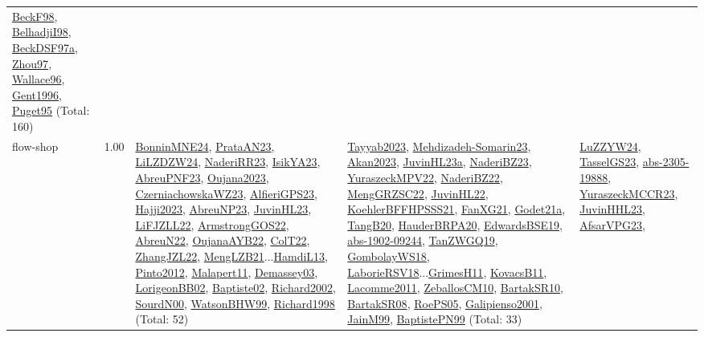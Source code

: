 {\begin{longtable}{p{3cm}r>{\raggedright\arraybackslash}p{6cm}>{\raggedright\arraybackslash}p{6cm}>{\raggedright\arraybackslash}p{8cm}}
\hyperref[detail:BeckF98]{BeckF98}, \hyperref[detail:BelhadjiI98]{BelhadjiI98}, \hyperref[detail:BeckDSF97a]{BeckDSF97a}, \hyperref[detail:Zhou97]{Zhou97}, \hyperref[detail:Wallace96]{Wallace96}, \hyperref[detail:Gent1996]{Gent1996}, \hyperref[detail:Puget95]{Puget95} (Total: 160)\\
\index{flow-shop}\index{Concepts!flow-shop}flow-shop &  1.00 & \hyperref[detail:BonninMNE24]{BonninMNE24}, \hyperref[detail:PrataAN23]{PrataAN23}, \hyperref[detail:LiLZDZW24]{LiLZDZW24}, \hyperref[detail:NaderiRR23]{NaderiRR23}, \hyperref[detail:IsikYA23]{IsikYA23}, \hyperref[detail:AbreuPNF23]{AbreuPNF23}, \hyperref[detail:Oujana2023]{Oujana2023}, \hyperref[detail:CzerniachowskaWZ23]{CzerniachowskaWZ23}, \hyperref[detail:AlfieriGPS23]{AlfieriGPS23}, \hyperref[detail:Hajji2023]{Hajji2023}, \hyperref[detail:AbreuNP23]{AbreuNP23}, \hyperref[detail:JuvinHL23]{JuvinHL23}, \hyperref[detail:LiFJZLL22]{LiFJZLL22}, \hyperref[detail:ArmstrongGOS22]{ArmstrongGOS22}, \hyperref[detail:AbreuN22]{AbreuN22}, \hyperref[detail:OujanaAYB22]{OujanaAYB22}, \hyperref[detail:ColT22]{ColT22}, \hyperref[detail:ZhangJZL22]{ZhangJZL22}, \hyperref[detail:MengLZB21]{MengLZB21}...\hyperref[detail:HamdiL13]{HamdiL13}, \hyperref[detail:Pinto2012]{Pinto2012}, \hyperref[detail:Malapert11]{Malapert11}, \hyperref[detail:Demassey03]{Demassey03}, \hyperref[detail:LorigeonBB02]{LorigeonBB02}, \hyperref[detail:Baptiste02]{Baptiste02}, \hyperref[detail:Richard2002]{Richard2002}, \hyperref[detail:SourdN00]{SourdN00}, \hyperref[detail:WatsonBHW99]{WatsonBHW99}, \hyperref[detail:Richard1998]{Richard1998} (Total: 52) & \hyperref[detail:Tayyab2023]{Tayyab2023}, \hyperref[detail:Mehdizadeh-Somarin23]{Mehdizadeh-Somarin23}, \hyperref[detail:Akan2023]{Akan2023}, \hyperref[detail:JuvinHL23a]{JuvinHL23a}, \hyperref[detail:NaderiBZ23]{NaderiBZ23}, \hyperref[detail:YuraszeckMPV22]{YuraszeckMPV22}, \hyperref[detail:NaderiBZ22]{NaderiBZ22}, \hyperref[detail:MengGRZSC22]{MengGRZSC22}, \hyperref[detail:JuvinHL22]{JuvinHL22}, \hyperref[detail:KoehlerBFFHPSSS21]{KoehlerBFFHPSSS21}, \hyperref[detail:FanXG21]{FanXG21}, \hyperref[detail:Godet21a]{Godet21a}, \hyperref[detail:TangB20]{TangB20}, \hyperref[detail:HauderBRPA20]{HauderBRPA20}, \hyperref[detail:EdwardsBSE19]{EdwardsBSE19}, \hyperref[detail:abs-1902-09244]{abs-1902-09244}, \hyperref[detail:TanZWGQ19]{TanZWGQ19}, \hyperref[detail:GombolayWS18]{GombolayWS18}, \hyperref[detail:LaborieRSV18]{LaborieRSV18}...\hyperref[detail:GrimesH11]{GrimesH11}, \hyperref[detail:KovacsB11]{KovacsB11}, \hyperref[detail:Lacomme2011]{Lacomme2011}, \hyperref[detail:ZeballosCM10]{ZeballosCM10}, \hyperref[detail:BartakSR10]{BartakSR10}, \hyperref[detail:BartakSR08]{BartakSR08}, \hyperref[detail:RoePS05]{RoePS05}, \hyperref[detail:Galipienso2001]{Galipienso2001}, \hyperref[detail:JainM99]{JainM99}, \hyperref[detail:BaptistePN99]{BaptistePN99} (Total: 33) & \hyperref[detail:LuZZYW24]{LuZZYW24}, \hyperref[detail:TasselGS23]{TasselGS23}, \hyperref[detail:abs-2305-19888]{abs-2305-19888}, \hyperref[detail:YuraszeckMCCR23]{YuraszeckMCCR23}, \hyperref[detail:JuvinHHL23]{JuvinHHL23}, \hyperref[detail:AfsarVPG23]{AfsarVPG23}, 
\end{longtable}}
